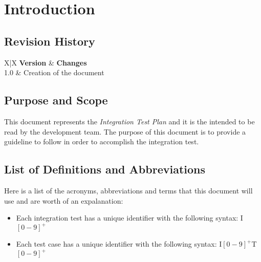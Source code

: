 \section{Introduction} %
\label{sec:introduction}

\subsection{Revision History} %
\label{sub:revision_history}
\begin{tabularx}{\textwidth}{ X|X }
	\textbf{Version} & \textbf{Changes} \\ \hline
	 {1.0} & Creation of the document \\
\end{tabularx}

\subsection{Purpose and Scope} %
\label{sub:purpose_and_scope}

This document represents the \emph{Integration Test Plan} and it is the intended to be read by the development team.
The purpose of this document is to provide a guideline to follow in order to accomplish the integration test.


\subsection{List of Definitions and Abbreviations} %
\label{sub:definitions_and_abbreviations}
Here is a list of the acronyms, abbreviations and terms that this document will use and are worth of an expalanation:

\begin{itemize}
	\item Each integration test has a unique identifier with the following syntax: \newline I$[0-9]^+$
	\item Each test case has a unique identifier with the following syntax: \newline I$[0-9]^+$T$[0-9]^+$
\end{itemize}


